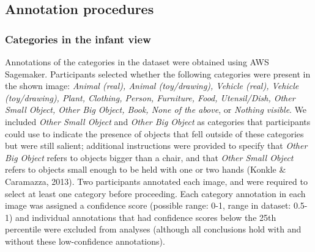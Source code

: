 \documentclass[10pt, letterpaper]{article}
\begin{document}
\hypertarget{annotation-procedures}{%
\subsection{Annotation procedures}\label{annotation-procedures}}

\hypertarget{categories-in-the-infant-view}{%
\subsubsection{Categories in the infant
view}\label{categories-in-the-infant-view}}

Annotations of the categories in the dataset were obtained using AWS
Sagemaker. Participants selected whether the following categories were
present in the shown image: \emph{Animal (real), Animal (toy/drawing),
Vehicle (real), Vehicle (toy/drawing), Plant, Clothing, Person,
Furniture, Food, Utensil/Dish, Other Small Object, Other Big Object,
Book, None of the above}, or \emph{Nothing visible}. We included
\emph{Other Small Object} and \emph{Other Big Object} as categories that
participants could use to indicate the presence of objects that fell
outside of these categories but were still salient; additional
instructions were provided to specify that \emph{Other Big Object}
refers to objects bigger than a chair, and that \emph{Other Small
Object} refers to objects small enough to be held with one or two hands
(Konkle \& Caramazza, 2013). Two participants annotated each image, and
were required to select at least one category before proceeding. Each
category annotation in each image was assigned a confidence score
(possible range: 0-1, range in dataset: 0.5-1) and individual
annotations that had confidence scores below the 25th percentile were
excluded from analyses (although all conclusions hold with and without
these low-confidence annotations).
\end{document}

